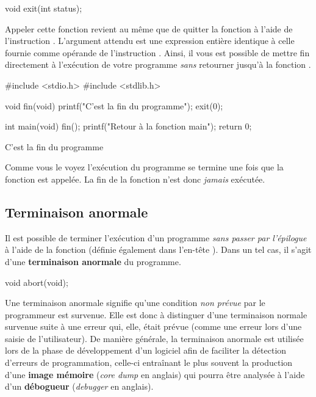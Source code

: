 \begin{C}
void exit(int status);
\end{C}

Appeler cette fonction revient au même que de quitter la fonction
 à l'aide de l'instruction . L'argument
attendu est une expression entière identique à celle fournie comme
opérande de l'instruction . Ainsi, il vous est possible
de mettre fin directement à l'exécution de votre programme \emph{sans}
retourner jusqu'à la fonction .

\begin{C}
#include <stdio.h>
#include <stdlib.h>


void fin(void)
{
    printf("C'est la fin du programme\n");
    exit(0);
}


int main(void)
{
    fin();
    printf("Retour à la fonction main\n");
    return 0;
}
\end{C}

\begin{C}
C'est la fin du programme
\end{C}

Comme vous le voyez l'exécution du programme se termine une fois que la
fonction  est appelée. La fin de la fonction
 n'est donc \emph{jamais} exécutée.

\subsection{Terminaison anormale}
\label{terminaison-anormale}

Il est possible de terminer l'exécution d'un programme \emph{sans passer
par l'épilogue} à l'aide de la fonction  (définie
également dans l'en-tête ).
Dans un tel cas, il s'agit d'une \textbf{terminaison anormale} du
programme.

\begin{C}
void abort(void);
\end{C}

Une terminaison anormale signifie qu'une condition \emph{non prévue} par
le programmeur est survenue. Elle est donc à distinguer d'une
terminaison normale survenue suite à une erreur qui, elle, était prévue
(comme une erreur lors d'une saisie de l'utilisateur). De manière
générale, la terminaison anormale est utilisée lors de la phase de
développement d'un logiciel afin de faciliter la détection d'erreurs de
programmation, celle-ci entraînant le plus souvent la production d'une
\textbf{image mémoire} (\emph{core dump} en anglais) qui pourra être
analysée à l'aide d'un \textbf{débogueur} (\emph{debugger} en anglais).

